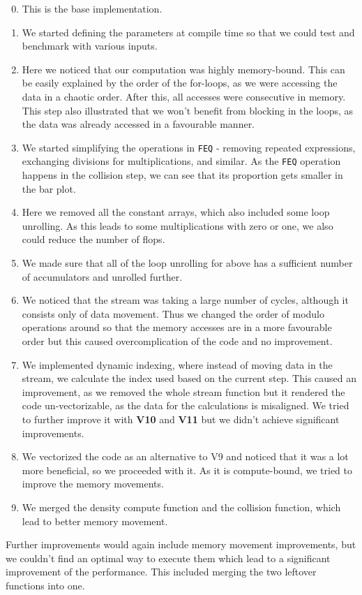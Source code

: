 \documentclass[letterpaper]{article}
\begin{document}
\begin{enumerate}[label=\textbf{V\arabic*:}]
    \setcounter{enumi}{-1}
    \item This is the base implementation.
    \item We started defining the parameters at compile time so that we could test and benchmark with various inputs. 
    \item Here we noticed that our computation was highly memory-bound. This can be easily explained by the order of the for-loops, as we were accessing the data in a chaotic order. After this, all accesses were consecutive in memory. This step also illustrated that we won't benefit from blocking in the loops, as the data was already accessed in a favourable manner.
    \item We started simplifying the operations in \texttt{FEQ} - removing repeated expressions, exchanging divisions for multiplications, and similar. As the \texttt{FEQ} operation happens in the collision step, we can see that its proportion gets smaller in the bar plot.
    \addtocounter{enumi}{1}
    \item Here we removed all the constant arrays, which also included some loop unrolling. As this leads to some multiplications with zero or one, we also could reduce the number of flops.
    \item We made sure that all of the loop unrolling for above has a sufficient number of accumulators and unrolled further.
    \item We noticed that the stream was taking a large number of cycles, although it consists only of data movement. Thus we changed the order of modulo operations around so that the memory accesses are in a more favourable order but this caused overcomplication of the code and no improvement.
    \addtocounter{enumi}{1}
    \item We implemented dynamic indexing, where instead of moving data in the stream, we calculate the index used based on the current step. This caused an improvement, as we removed the whole stream function but it rendered the code un-vectorizable, as the data for the calculations is misaligned. We tried to further improve it with \textbf{V10} and  \textbf{V11} but we didn't achieve significant improvements.
    \addtocounter{enumi}{1}
    \item We vectorized the code as an alternative to V9 and noticed that it was a lot more beneficial, so we proceeded with it. As it is compute-bound, we tried to improve the memory movements.
    \addtocounter{enumi}{1}
    \item We merged the density compute function and the collision function, which lead to better memory movement.
\end{enumerate}
Further improvements would again include memory movement improvements, but we couldn't find an optimal way to execute them which lead to a significant improvement of the performance. This included merging the two leftover functions into one.
\end{document}
